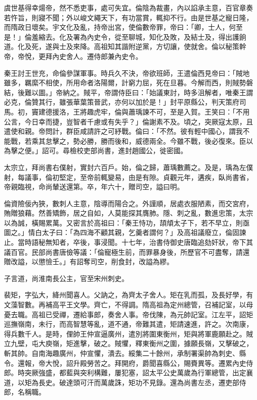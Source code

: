 \begin{pinyinscope}
 虞世基得幸煬帝，然不悉吏事，處可失宜。倫陰為裁畫，內以諂承主意，百官章奏若忤旨，則寢不聞；外以峻文繩天下，有功當賞，輒抑不行。由是世基之寵日隆，而隋政日壞矣。宇文化及亂，持帝出宮，使倫數帝罪，帝曰：「卿，士人，何至是！」倫羞縮去。化及署為內史令，從至聊城，知化及敗，及結士及，得出護餉道。化及死，遂與士及來降。高祖知其諧附逆黨，方切讓，使就舍。倫以秘策幹帝，帝悅，更拜內史舍人。遷侍郎兼內史令。



 秦王討王世充，命倫參謀軍事。時兵久不決，帝欲班師，王遣倫西見帝曰：「賊地雖多，羈縻不相使，所用命者洛陽爾，計窮力屈，死在旦暮。今解而西，則賊勢磐結，後難以圖。」帝納之。賊平，帝謂侍臣曰：「始議東討，時多沮解者，唯秦王謂必克，倫贊其行，雖張華葉策晉武，亦何以加於是！」封平原縣公，判天策府司馬。初，竇建德援洛，王將趣虎牢，倫與蕭瑀諫不可，至是入賀。王笑曰：「不用公言，今日幸而捷，豈智者千慮或有失乎？」倫謝素不及。頃之，突厥寇太原，且遣使和親。帝問計，群臣咸請許之可紓戰。倫曰：「不然。彼有輕中國心，謂我不能戰，若乘其怠擊之，勢必勝，勝而後和，威德兩全。今雖不戰，後必復來。臣以為擊之便。」詔可。尋檢校吏部尚書，進封趙國公，徙密國。



 太宗立，拜尚書右僕射，實封六百戶。始，倫之歸，蕭瑀數薦之。及是，瑀為左僕射，每議事，倫初堅定，至帝前輒變易，由是有隙。貞觀元年，遘疾，臥尚書省，帝親臨視，命尚輦送還第。卒，年六十，贈司空，謚曰明。



 倫資險佞內狹，數刺人主意，陰導而陽合之。外謹順，居處衣服陋素，而交宮府，賄贈狼藉。然善矯飾，居之自如，人莫能探其膺肺。隱、刺之亂，數進忠策，太宗以為誠，橫賜累萬。又密言於高祖曰：「秦王恃功，頡頏太子下，若不早立，則亟圖之。」情白太子曰：「為四海不顧其親，乞羹者謂何？」及高祖議廢立，倫固諫止。當時語秘無知者，卒後，事浸聞。十七年，治書侍御史唐臨追劾奸狀，帝下其議百官。民部尚書唐儉等議：「倫寵極生前，而罪暴身後，所歷官不可盡奪，請還贈改謚，以懲憸壬。」有詔奪司空，削食封，改謚為繆。



 子言道，尚淮南長公主，官至宋州刺史。



 裴矩，字弘大，絳州聞喜人。父訥之，為齊太子舍人。矩在乳而孤，及長好學，有文藻智數。再補高平王文學。齊亡，不得調。隋高祖為定州總管，召補記室，以母憂去職。高祖已受禪，遷給事郎，奏舍人事。帝伐陳，為元帥記室。江左平，詔矩巡撫嶺南，未行，而高智慧等亂，道不通，帝難其遣，矩請速進，許之。次南康，得兵數千人。是時，俚帥王仲宣逼廣州，遣別將圍東衡州，矩與將軍鹿願赴之。賊立九壁，屯大庾嶺，矩進擊，破之。賊懼，釋東衡州之圍，據願長嶺，又擊破之，斬其帥。自南海趣廣州，仲宣懼，潰去。綏集二十餘州，承制署渠帥為刺史、縣令。還報，帝大悅，詔升殿勞苦之。拜開府，爵聞喜縣公，賜賚異等。遷累內史侍郎。時突厥強盛，都藍與突利構難，屢犯塞，詔太平公史萬歲為行軍總管，出定襄道，以矩為長史。破達頭可汗而萬歲誅，矩功不見錄。還為尚書左丞，遷吏部侍郎，名稱職。




\end{pinyinscope}
